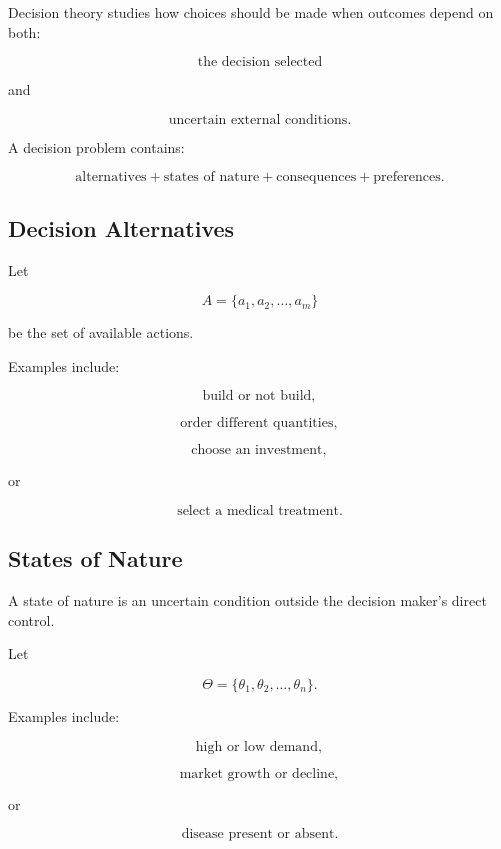 Decision theory studies how choices should be made when outcomes depend on
both:

\[
\boxed{
\text{the decision selected}
}
\]

and

\[
\boxed{
\text{uncertain external conditions}.
}
\]

A decision problem contains:

\[
\boxed{
\text{alternatives}
+
\text{states of nature}
+
\text{consequences}
+
\text{preferences}.
}
\]

\subsection{Decision Alternatives}
\label{subsec:decision-alternatives}

Let

\[
\boxed{
A
=
\{a_1,a_2,\ldots,a_m\}
}
\]

be the set of available actions.

Examples include:

\[
\boxed{
\text{build or not build},
}
\]

\[
\boxed{
\text{order different quantities},
}
\]

\[
\boxed{
\text{choose an investment},
}
\]

or

\[
\boxed{
\text{select a medical treatment}.
}
\]

\subsection{States of Nature}
\label{subsec:states-of-nature}

A state of nature is an uncertain condition outside the decision maker's
direct control.

Let

\[
\boxed{
\Theta
=
\{\theta_1,\theta_2,\ldots,\theta_n\}.
}
\]

Examples include:

\[
\boxed{
\text{high or low demand},
}
\]

\[
\boxed{
\text{market growth or decline},
}
\]

or

\[
\boxed{
\text{disease present or absent}.
}
\]

